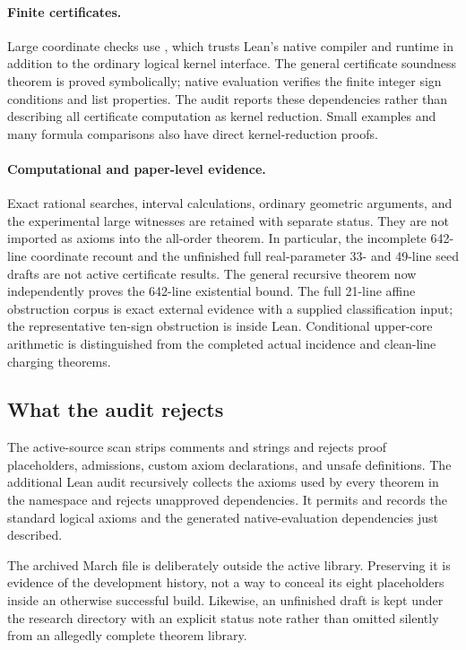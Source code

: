 \paragraph{Finite certificates.}
Large coordinate checks use , which trusts Lean's native compiler and runtime in addition to the ordinary logical kernel interface. The general certificate soundness theorem is proved symbolically; native evaluation verifies the finite integer sign conditions and list properties. The audit reports these dependencies rather than describing all certificate computation as kernel reduction. Small examples and many formula comparisons also have direct kernel-reduction proofs.

\paragraph{Computational and paper-level evidence.}
Exact rational searches, interval calculations, ordinary geometric arguments, and the experimental large witnesses are retained with separate status. They are not imported as axioms into the all-order theorem. In particular, the incomplete 642-line coordinate recount and the unfinished full real-parameter 33- and 49-line seed drafts are not active certificate results. The general recursive theorem now independently proves the 642-line existential bound. The full 21-line affine obstruction corpus is exact external evidence with a supplied classification input; the representative ten-sign obstruction is inside Lean. Conditional upper-core arithmetic is distinguished from the completed actual incidence and clean-line charging theorems.

\subsection{What the audit rejects}

The active-source scan strips comments and strings and rejects proof placeholders, admissions, custom axiom declarations, and unsafe definitions. The additional Lean audit recursively collects the axioms used by every theorem in the  namespace and rejects unapproved dependencies. It permits and records the standard logical axioms and the generated native-evaluation dependencies just described.

The archived March file is deliberately outside the active library. Preserving it is evidence of the development history, not a way to conceal its eight placeholders inside an otherwise successful build. Likewise, an unfinished draft is kept under the research directory with an explicit status note rather than omitted silently from an allegedly complete theorem library.

